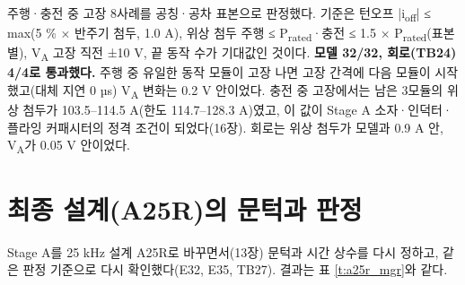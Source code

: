 주행·충전 중 고장 8사례를 공칭·공차 표본으로 판정했다. 기준은 턴오프 |i\textsubscript{off}| ≤ max(5 \% × 반주기 첨두, 1.0 A), 위상 첨두 주행 ≤ P\textsubscript{rated}·충전 ≤ 1.5 × P\textsubscript{rated}(표본별), V\textsubscript{A} 고장 직전 ±10 V, 끝 동작 수가 기대값인 것이다. \textbf{모델 32/32, 회로(TB24) 4/4로 통과했다.} 주행 중 유일한 동작 모듈이 고장 나면 고장 간격에 다음 모듈이 시작했고(대체 지연 0 µs) V\textsubscript{A} 변화는 0.2 V 안이었다. 충전 중 고장에서는 남은 3모듈의 위상 첨두가 103.5–114.5 A(한도 114.7–128.3 A)였고, 이 값이 Stage A 소자·인덕터·플라잉 커패시터의 정격 조건이 되었다(16장). 회로는 위상 첨두가 모델과 0.9 A 안, V\textsubscript{A}가 0.05 V 안이었다.

\section{최종 설계(A25R)의 문턱과 판정}

Stage A를 25 kHz 설계 A25R로 바꾸면서(13장) 문턱과 시간 상수를 다시 정하고, 같은 판정 기준으로 다시 확인했다(E32, E35, TB27). 결과는 표 \ref{t:a25r_mgr}와 같다.

